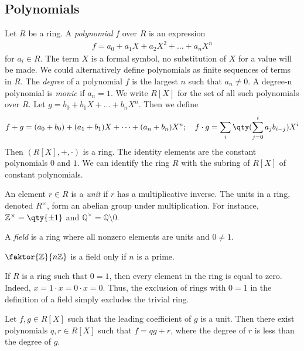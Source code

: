 \subsection{Polynomials}
\begin{definition}
	Let $R$ be a ring.
	A \textit{polynomial} $f$ over $R$ is an expression
	\begin{align*}
		f = a_0 + a_1 X + a_2 X^2 + \dots + a_n X^n
	\end{align*}
	for $a_i \in R$.
	The term $X$ is a formal symbol, no substitution of $X$ for a value will be made.
	We could alternatively define polynomials as finite sequences of terms in $R$.
	The \textit{degree} of a polynomial $f$ is the largest $n$ such that $a_n \neq 0$.
	A degree-n polynomial is \textit{monic} if $a_n = 1$.
	We write $R[X]$ for the set of all such polynomials over $R$.
	Let $g = b_0 + b_1 X + \dots + b_n X^n$.
	Then we define
	\begin{align*}
		f + g = (a_0 + b_0) + (a_1 + b_1) X + \dots + (a_n + b_n) X^n;\quad f \cdot g = \sum_i \qty(\sum_{j=0}^i a_j b_{i-j}) X^i
	\end{align*}
	Then $(R[X], +, \cdot)$ is a ring.
	The identity elements are the constant polynomials $0$ and $1$.
	We can identify the ring $R$ with the subring of $R[X]$ of constant polynomials.
\end{definition}
\begin{definition}
	An element $r \in R$ is a \textit{unit} if $r$ has a multiplicative inverse.
	The units in a ring, denoted $R^\times$, form an abelian group under multiplication.
	For instance, $\mathbb Z^\times = \qty{\pm 1}$ and $\mathbb Q^\times = \mathbb Q \setminus \qty{0}$.
\end{definition}
\begin{definition}
	A \textit{field} is a ring where all nonzero elements are units and $0 \neq 1$.
\end{definition}
\begin{example}
	$\faktor{\mathbb Z}{n\mathbb Z}$ is a field only if $n$ is a prime.
\end{example}
\begin{remark}
	If $R$ is a ring such that $0 = 1$, then every element in the ring is equal to zero.
	Indeed, $x = 1\cdot x = 0\cdot x = 0$.
	Thus, the exclusion of rings with $0 = 1$ in the definition of a field simply excludes the trivial ring.
\end{remark}
\begin{proposition}
	Let $f, g \in R[X]$ such that the leading coefficient of $g$ is a unit.
	Then there exist polynomials $q, r \in R[X]$ such that $f = qg + r$, where the degree of $r$ is less than the degree of $g$.
\end{proposition}

